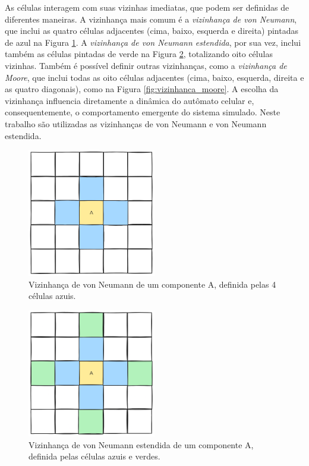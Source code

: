 \documentclass[12pt,oneside]{report}
\begin{document}
As células interagem com suas vizinhas imediatas, que podem ser definidas de diferentes maneiras. A vizinhança mais comum é a \textit{vizinhança de von Neumann}, que inclui as quatro células adjacentes (cima, baixo, esquerda e direita) pintadas de azul na Figura \ref{fig:vizinhanca_von_neumann}. A \textit{vizinhança de von Neumann estendida}, por sua vez, inclui também as células pintadas de verde na Figura \ref{fig:vizinhanca_von_neumann_estendida}, totalizando oito células vizinhas. Também é possível definir outras vizinhanças, como a \textit{vizinhança de Moore}, que inclui todas as oito células adjacentes (cima, baixo, esquerda, direita e as quatro diagonais), como na Figura \ref{fig:vizinhanca_moore}. A escolha da vizinhança influencia diretamente a dinâmica do autômato celular e, consequentemente, o comportamento emergente do sistema simulado. Neste trabalho são utilizadas as vizinhanças de von Neumann e von Neumann estendida.

\begin{figure}[H]
    \centering
    \includegraphics[width=0.5\textwidth]{img/vizinhanca_von_neumann.png}
    \caption{\small Vizinhança de von Neumann de um componente A, definida pelas 4 células azuis.}
    \label{fig:vizinhanca_von_neumann}
\end{figure}

\begin{figure}[H]
    \centering
    \includegraphics[width=0.5\textwidth]{img/vizinhanca_von_neumann_estendida.png}
    \caption{\small Vizinhança de von Neumann estendida de um componente A, definida pelas células azuis e verdes.}
    \label{fig:vizinhanca_von_neumann_estendida}
\end{figure}
\end{document}
